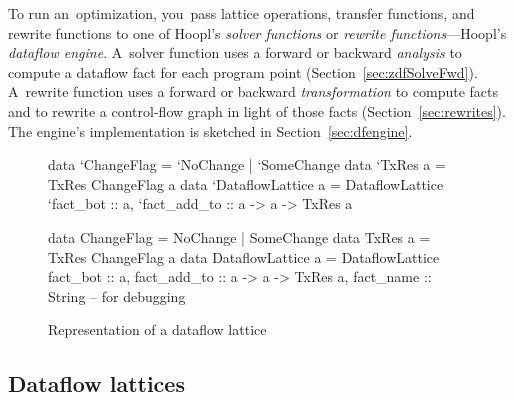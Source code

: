 \documentclass[blockstyle,preprint,natbib,nocopyrightspace]{sigplanconf}
\newcommand\ourlib{Hoopl}  %
\newcommand\delendum[1]{\relax\ifvmode\else\unskip\fi\relax}
\newcommand\secref[1]{Section~\ref{sec:#1}}
\newcommand\seclabel[1]{\label{sec:#1}}
\newcommand\figlabel[1]{\label{fig:#1}}
\begin{document}
To run an~optimization, you~pass lattice
operations, transfer functions, and rewrite functions
to one of \ourlib's
\emph{solver functions} or \emph{rewrite functions}---\ourlib's 
\emph{dataflow engine}.
A~solver function 
uses a forward or backward \emph{analysis} to compute 
a dataflow fact for each program point (\secref{zdfSolveFwd}).
A~rewrite function
uses a forward or backward \emph{transformation} to compute facts and to
rewrite a control-flow graph in light of those facts
(\secref{rewrites}).
\ifcutting\else
The engine's implementation is sketched in \secref{dfengine}.
\fi
\delendum{Interface?  Perhpas ``The signatures and expected usage of these
functions is described in xxx, while their implementation is sketched
in yyy''.  NR: I like the idea of parallel structure, but the paper is
not really very parallel here.  Faced with either repeating the
section references or distorting what those sections are about, I've
chosen instead to abandon parallel structure.}



\begin{figure}
\ifcutting
\begin{code}
data `ChangeFlag = `NoChange | `SomeChange
data `TxRes a    = TxRes ChangeFlag a
data `DataflowLattice a = DataflowLattice
 {`fact_bot        :: a,
  `fact_add_to     :: a -> a -> TxRes a}
\end{code}
\else
\begin{code}
data ChangeFlag = NoChange | SomeChange
data TxRes a    = TxRes ChangeFlag a
data DataflowLattice a = DataflowLattice
 {fact_bot        :: a,
  fact_add_to     :: a -> a -> TxRes a,
  fact_name       :: String } -- for debugging
\end{code}
\fi
\caption{Representation of a dataflow lattice} \figlabel{lattice-type} \figlabel{lattice}
\end{figure}


\subsection{Dataflow lattices}

\seclabel{lattices}
\end{document}
